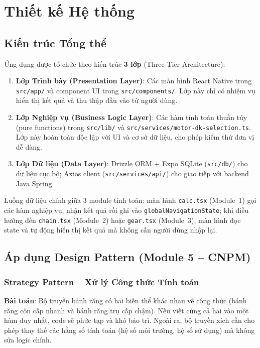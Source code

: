 \chapter{Thiết kế Hệ thống}
\label{chap:design}

\section{Kiến trúc Tổng thể}
\label{sec:design-architecture}

Ứng dụng được tổ chức theo kiến trúc \textbf{3 lớp} (Three-Tier Architecture):

\begin{enumerate}
  \item \textbf{Lớp Trình bày (Presentation Layer)}: Các màn hình React Native
        trong \texttt{src/app/} và component UI trong \texttt{src/components/}.
        Lớp này chỉ có nhiệm vụ hiển thị kết quả và thu thập đầu vào từ người dùng.
  \item \textbf{Lớp Nghiệp vụ (Business Logic Layer)}: Các hàm tính toán thuần túy
        (pure functions) trong \texttt{src/lib/} và \texttt{src/services/motor-dk-selection.ts}.
        Lớp này hoàn toàn độc lập với UI và cơ sở dữ liệu,
        cho phép kiểm thử đơn vị dễ dàng.
  \item \textbf{Lớp Dữ liệu (Data Layer)}: Drizzle ORM + Expo SQLite
        (\texttt{src/db/}) cho dữ liệu cục bộ;
        Axios client (\texttt{src/services/api/}) cho giao tiếp với backend Java Spring.
\end{enumerate}

Luồng dữ liệu chính giữa 3 module tính toán:
màn hình \texttt{calc.tsx} (Module~1) gọi các hàm nghiệp vụ,
nhận kết quả rồi ghi vào \texttt{globalNavigationState};
khi điều hướng đến \texttt{chain.tsx} (Module~2) hoặc \texttt{gear.tsx} (Module~3),
màn hình đọc state và tự động hiển thị kết quả mà không cần người dùng nhập lại.

\section{Áp dụng Design Pattern (Module 5 -- CNPM)}
\label{sec:design-patterns}

\subsection{Strategy Pattern -- Xử lý Công thức Tính toán}

\textbf{Bài toán}: Bộ truyền bánh răng có hai biến thể khác nhau về công thức
(bánh răng côn cấp nhanh và bánh răng trụ cấp chậm).
Nếu viết cứng cả hai vào một hàm duy nhất, code sẽ phức tạp và khó bảo trì.
Ngoài ra, bộ truyền xích cần cho phép thay thế các hằng số tính toán
(hệ số môi trường, hệ số sử dụng) mà không sửa logic chính.

